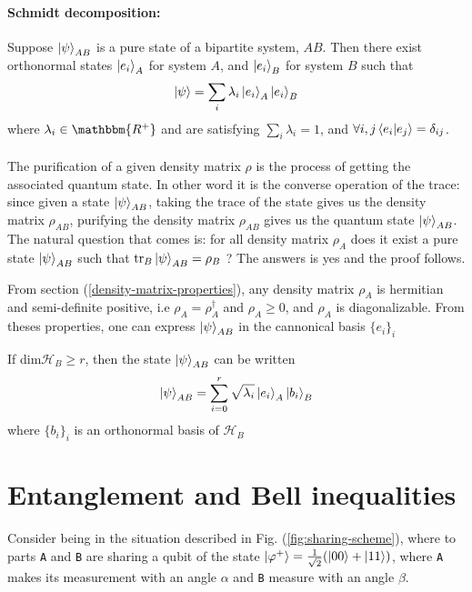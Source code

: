 \documentclass{article}
\begin{document}
\paragraph{Schmidt decomposition: }
Suppose $\ket{\psi}_{AB}$ is a pure state of a bipartite system, $AB$. Then
there exist orthonormal states $\ket{e_i}_A$ for system $A$, and $\ket{e_i}_B$
for system $B$ such that
\begin{equation}
    \ket{\psi} = \sum_i\lambda_i \ket{e_i}_A \ket{e_i}_B
\end{equation}
where $\lambda_i \in \mathbbm{R^+}$ and are satisfying $\sum_i\lambda_i=1$, and
$\forall i,j \braket{e_i|e_j}=\delta_{ij}$.
\\ \\
The purification of a given density matrix $\rho$ is the process of getting the
associated quantum state. In other word it is the converse operation of the
trace: since given a state $\ket{\psi}_{AB}$, taking the trace of the state
gives us the density matrix $\rho_{AB}$, purifying the density matrix
$\rho_{AB}$ gives us the quantum state $\ket{\psi}_{AB}$.\\
The natural question that comes is: for all density matrix $\rho_A$ does it
exist a pure state $\ket{\psi}_{AB}$ such that $\text{tr}_B\ket{\psi}_{AB} =
\rho_B$ ? The answers is yes and the proof follows.

From section (\ref{density-matrix-properties}), any density matrix $\rho_A$ is
hermitian and semi-definite positive, i.e $\rho_A=\rho^\dagger_A$ and $\rho_A
\geq 0$, and $\rho_A$ is diagonalizable. From theses properties, one can express
$\ket{\psi}_{AB}$ in the cannonical basis $\{e_i\}_i$

If dim$\mathscr{H}_B \geq r$, then the state $\ket{\psi}_{AB}$
can be written
\begin{equation}
    \ket{\psi}_{AB} = \sum_{i=0}^r \sqrt{\lambda_i} \ket{e_i}_A\ket{b_i}_B
\end{equation}
where $\{b_i\}_i$ is an orthonormal basis of $\mathscr{H}_B$

\section{Entanglement and Bell inequalities}

Consider being in the situation described in Fig. (\ref{fig:sharing-scheme}),
where to parts \texttt{A} and \texttt{B} are sharing a qubit of the state
$\ket{\varphi^+}=\frac{1}{\sqrt{2}}(\ket{00} + \ket{11})$, where \texttt{A} makes
its measurement with an angle $\alpha$ and \texttt{B} measure with an angle
$\texttt{$\beta$}$.
\end{document}
